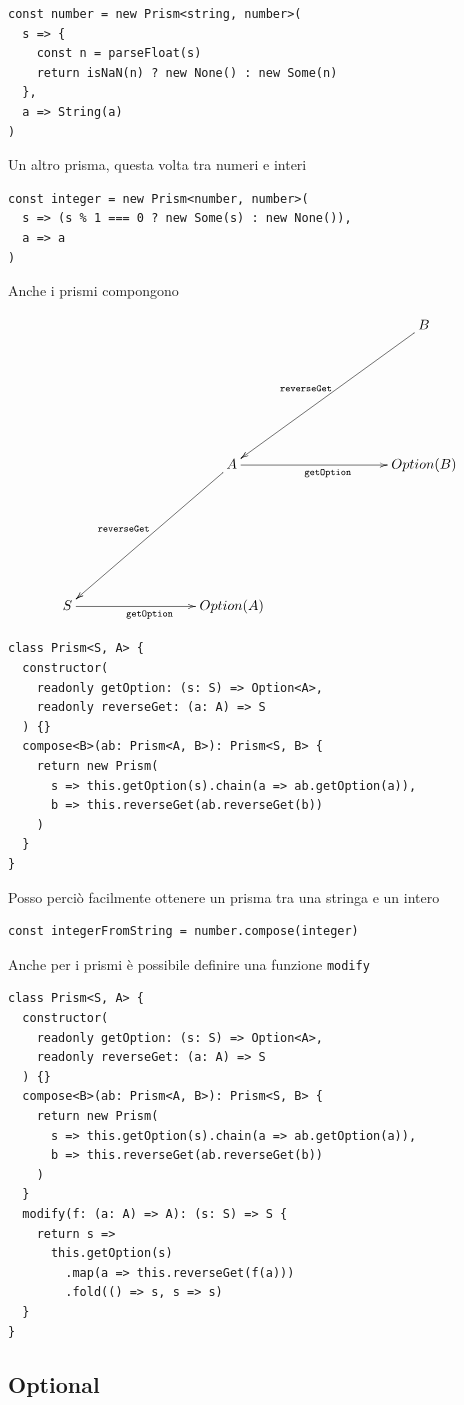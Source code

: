 \documentclass[12pt]{article}
\begin{document}
\begin{verbatim}
const number = new Prism<string, number>(
  s => {
    const n = parseFloat(s)
    return isNaN(n) ? new None() : new Some(n)
  },
  a => String(a)
)
\end{verbatim}

Un altro prisma, questa volta tra numeri e interi

\begin{verbatim}
const integer = new Prism<number, number>(
  s => (s % 1 === 0 ? new Some(s) : new None()),
  a => a
)
\end{verbatim}

Anche i prismi compongono

\[
\xymatrixrowsep{3cm}
\xymatrixcolsep{3cm}
\xymatrix{
  & & B \ar[dl]_{\texttt{reverseGet}} \\
  & A \ar[dl]_{\texttt{reverseGet}} \ar[r]_{\texttt{getOption}} & {Option(B)} \\
  S \ar[r]_{\texttt{getOption}} & {Option(A)}
}
\]

\begin{verbatim}
class Prism<S, A> {
  constructor(
    readonly getOption: (s: S) => Option<A>,
    readonly reverseGet: (a: A) => S
  ) {}
  compose<B>(ab: Prism<A, B>): Prism<S, B> {
    return new Prism(
      s => this.getOption(s).chain(a => ab.getOption(a)),
      b => this.reverseGet(ab.reverseGet(b))
    )
  }
}
\end{verbatim}

Posso perciò facilmente ottenere un prisma tra una stringa e un intero

\begin{verbatim}
const integerFromString = number.compose(integer)
\end{verbatim}

Anche per i prismi è possibile definire una funzione \texttt{modify}

\begin{verbatim}
class Prism<S, A> {
  constructor(
    readonly getOption: (s: S) => Option<A>,
    readonly reverseGet: (a: A) => S
  ) {}
  compose<B>(ab: Prism<A, B>): Prism<S, B> {
    return new Prism(
      s => this.getOption(s).chain(a => ab.getOption(a)),
      b => this.reverseGet(ab.reverseGet(b))
    )
  }
  modify(f: (a: A) => A): (s: S) => S {
    return s =>
      this.getOption(s)
        .map(a => this.reverseGet(f(a)))
        .fold(() => s, s => s)
  }
}
\end{verbatim}

\subsection{Optional}
\end{document}
